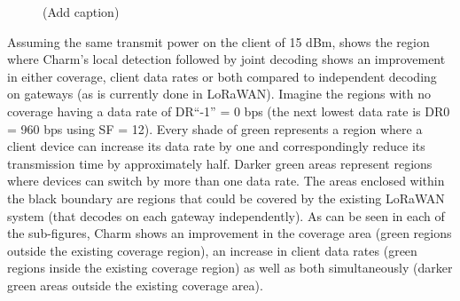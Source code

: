 \begin{figure}[!htb]
\centering
{} \hfill
{} \hfill
{}
\compactimg
\caption{{\color{blue} (Add caption)}}
\label{fig:charm-improvement}
\compactimg
\end{figure}

Assuming the same transmit power on the client of 15 dBm,  shows the region where Charm's local detection followed by joint decoding shows an improvement in either coverage, client data rates or both compared to independent decoding on gateways (as is currently done in LoRaWAN). Imagine the regions with no coverage having a data rate of DR``-1'' = 0 bps (the next lowest data rate is DR0 = 960 bps using SF = 12). Every shade of green represents a region where a client device can increase its data rate by one and correspondingly reduce its transmission time by approximately half. Darker green areas represent regions where devices can switch by more than one data rate. The areas enclosed within the black boundary are regions that could be covered by the existing LoRaWAN system (that decodes on each gateway independently). As can be seen in each of the sub-figures, Charm shows an improvement in the coverage area (green regions outside the existing coverage region), an increase in client data rates (green regions inside the existing coverage region) as well as both simultaneously (darker green areas outside the existing coverage area).

